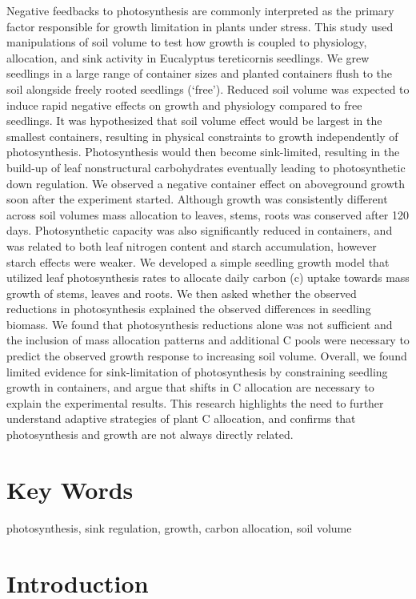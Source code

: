 \documentclass[a4paper]{article}\usepackage[]{graphicx}\usepackage[]{color}
\begin{document}
Negative feedbacks to photosynthesis are commonly interpreted as the primary factor responsible for growth limitation in plants under stress.  This study used manipulations of soil volume to test how growth is coupled to physiology, allocation, and sink activity in Eucalyptus tereticornis seedlings. We grew seedlings in a large range of container sizes and planted containers flush to the soil alongside freely rooted seedlings (‘free’). Reduced soil volume was expected to induce rapid negative effects on growth and physiology compared to free seedlings. It was hypothesized that soil volume effect would be largest in the smallest containers, resulting in physical constraints to growth independently of photosynthesis. Photosynthesis would then become sink-limited, resulting in the build-up of leaf nonstructural carbohydrates eventually leading to photosynthetic down regulation. We observed a negative container effect on aboveground growth soon after the experiment started. Although growth was consistently different across soil volumes mass allocation to leaves, stems, roots was conserved after 120 days. Photosynthetic capacity was also significantly reduced in containers, and was related to both leaf nitrogen content and starch accumulation, however starch effects were weaker. We developed a simple seedling growth model that utilized leaf photosynthesis rates to allocate daily carbon (c) uptake towards mass growth of stems, leaves and roots. We then asked whether the observed reductions in photosynthesis explained the observed differences in seedling biomass.  We found that photosynthesis reductions alone was not sufficient and the inclusion of mass allocation patterns and additional C pools were necessary to predict the observed growth response to increasing soil volume. Overall, we found limited evidence for sink-limitation of photosynthesis by constraining seedling growth in containers, and argue that shifts in C allocation are necessary to explain the experimental results. This research highlights the need to further understand adaptive strategies of plant C allocation, and confirms that photosynthesis and growth are not always directly related.

\section*{Key Words}

photosynthesis, sink regulation, growth, carbon allocation, soil volume


\section*{Introduction}
\end{document}
